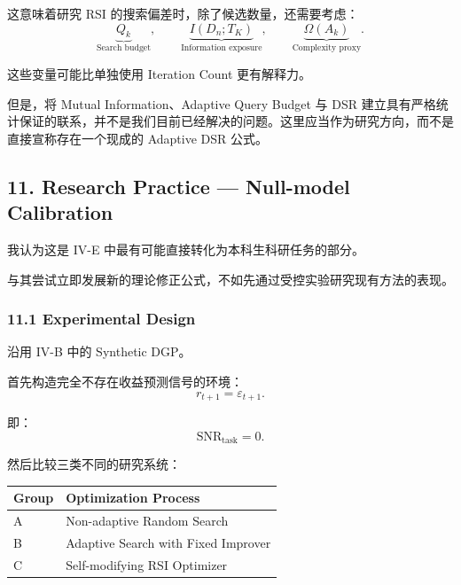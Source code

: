这意味着研究 RSI 的搜索偏差时，除了候选数量，还需要考虑：
\[\underbrace{Q_k}_{\text{Search budget}},
\qquad
\underbrace{I(D_n;T_K)}_{\text{Information exposure}},
\qquad
\underbrace{\Omega(A_k)}_{\text{Complexity proxy}}.\]

这些变量可能比单独使用 Iteration Count 更有解释力。

但是，将 Mutual Information、Adaptive Query Budget 与 DSR 建立具有严格统计保证的联系，并不是我们目前已经解决的问题。这里应当作为研究方向，而不是直接宣称存在一个现成的 Adaptive DSR 公式。

\hypertarget{part-4-71-0001-research-practice-null-model-calibration}{%
\subsection{11. Research Practice --- Null-model Calibration}\label{part-4-71-0001-research-practice-null-model-calibration}}

我认为这是 IV-E 中最有可能直接转化为本科生科研任务的部分。

与其尝试立即发展新的理论修正公式，不如先通过受控实验研究现有方法的表现。

\hypertarget{part-4-71-0001-experimental-design}{%
\subsubsection{11.1 Experimental Design}\label{part-4-71-0001-experimental-design}}

沿用 IV-B 中的 Synthetic DGP。

首先构造完全不存在收益预测信号的环境：
\[r_{t+1}=\varepsilon_{t+1}.\]

即：
\[\mathrm{SNR}_{\mathrm{task}}=0.\]

然后比较三类不同的研究系统：

\begin{readertable}
\begin{longtable}[]{@{}
  >{\raggedright\arraybackslash}p{}
  >{\raggedright\arraybackslash}p{}@{}}
\toprule
Group & Optimization Process \\
\midrule
\endhead
A & Non-adaptive Random Search \\
B & Adaptive Search with Fixed Improver \\
C & Self-modifying RSI Optimizer \\
\bottomrule
\end{longtable}
\end{readertable}

